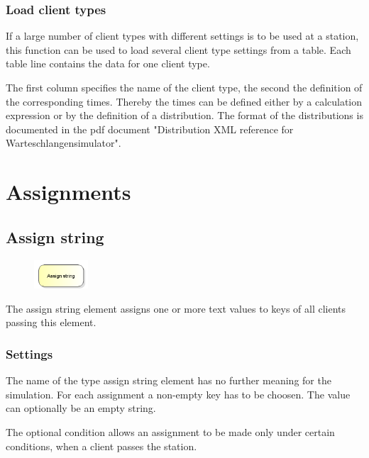 \subsection*{Load client types}

If a large number of client types with different settings is to be used at a station, this function can be used
to load several client type settings from a table. Each table line contains the data for one client type.

The first column specifies the name of the client type, the second the definition of the corresponding times.
Thereby the times can be defined either by a calculation expression or by the definition of a
distribution. The format of the distributions is documented in the pdf document
"Distribution XML reference for Warteschlangensimulator".





\chapter{Assignments}

\section{Assign string}
\label{ref:ModelElementAssignString}

\begin{figure}
\vspace{-22pt}
\includegraphics[width=2cm]{imageModelElementAssignString.png}
\vspace{-22pt}
\end{figure}

The assign string element assigns one or more text values to keys of all clients passing this element.

\subsection*{Settings}

The name of the type assign string element has no further meaning for the simulation.
For each assignment a non-empty key has to be choosen. The value can optionally be an empty string.

The optional condition allows an assignment to be made only under certain conditions,
when a client passes the station.


